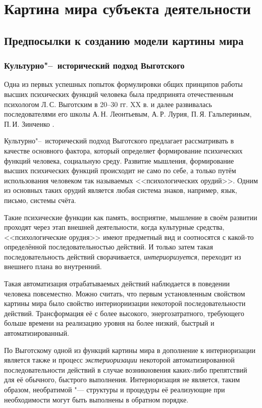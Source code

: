 \chapter{Картина мира субъекта деятельности} \label{chapt1}

\section{Предпосылки к созданию модели картины мира} \label{sect1_1}

\subsection{Культурно"--~исторический подход Выготского}

Одна из первых успешных попыток формулировки общих принципов работы высших психических функций человека была предпринята отечественным психологом Л.\,С. Выготским в 20--30 гг. XX в. \cite{Vygotsky2005} и далее развивалась последователями его школы А.\,Н. Леонтьевым, А.\,Р. Лурия, П.\,Я. Гальпериным, П.\,И. Зинченко \cite{Zinchenko1959,Luria1963,Luria1970}. 

Культурно"--~исторический подход Выготского предлагает рассматривать в качестве основного фактора, который определяет формирование психических функций человека, социальную среду. Развитие мышления, формирование высших психических функций происходит не само по себе, а только путём использования человеком так называемых <<психологических орудий>>. Одним из основных таких орудий является любая система знаков, например, язык, письмо, системы счёта.

Такие психические функции как память, восприятие, мышление в своём развитии проходят через этап внешней деятельности, когда культурные средства, <<психологические орудия>> имеют предметный вид и соотносятся с какой-то определённой последовательностью действий. И только затем такая последовательность действий сворачивается, \textit{интериоризуется}, переходит из внешнего плана во внутренний. 

Такая автоматизация отрабатываемых действий наблюдается в поведении человека повсеместно. Можно считать, что первым установленным свойством картины мира было свойство интериориизации некоторой последовательности действий. Трансформация её с более высокого, энергозатратного, требующего больше времени на реализацию уровня на более низкий, быстрый и автоматизированный.

По Выготскому одной из функций картины мира в дополнение к интериоризации является также и процесс \textit{экстериоризации} некоторой автоматизированной последовательности действий в случае возникновения каких-либо препятствий для её обычного, быстрого выполнения. Интериоризация не является, таким образом, необратимой "--- структуры и процедуры её реализующие при необходимости могут быть выполнены в обратном порядке.

